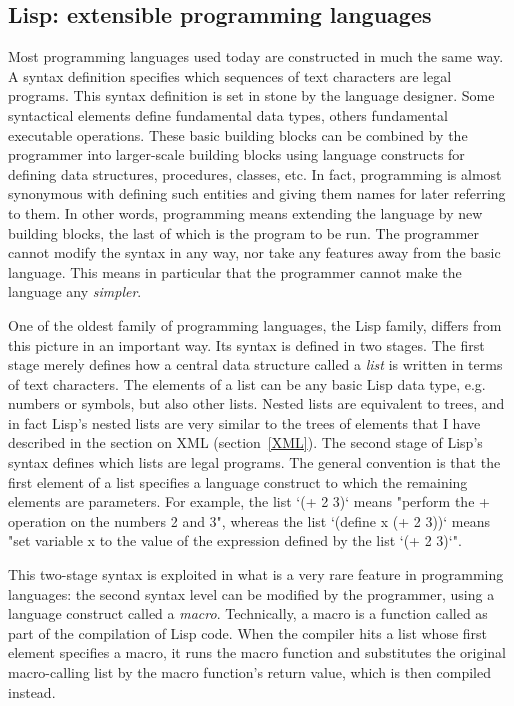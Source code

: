 \subsection{Lisp: extensible programming languages}
\label{lisp}

Most programming languages used today are constructed in much the same way. A syntax definition specifies which sequences of text characters are legal programs. This syntax definition is set in stone by the language designer. Some syntactical elements define fundamental data types, others fundamental executable operations. These basic building blocks can be combined by the programmer into larger-scale building blocks using language constructs for defining data structures, procedures, classes, etc. In fact, programming is almost synonymous with defining such entities and giving them names for later referring to them. In other words, programming means extending the language by new building blocks, the last of which is the program to be run. The programmer cannot modify the syntax in any way, nor take any features away from the basic language. This means in particular that the programmer cannot make the language any \textit{simpler}.

One of the oldest family of programming languages, the Lisp family, differs from this picture in an important way. Its syntax is defined in two stages. The first stage merely defines how a central data structure called a \textit{list} is written in terms of text characters. The elements of a list can be any basic Lisp data type, e.g. numbers or symbols, but also other lists. Nested lists are equivalent to trees, and in fact Lisp's nested lists are very similar to the trees of elements that I have described in the section on XML (section~\ref{XML}). The second stage of Lisp's syntax defines which lists are legal programs. The general convention is that the first element of a list specifies a language construct to which the remaining elements are parameters. For example, the list `(+ 2 3)` means "perform the + operation on the numbers 2 and 3", whereas the list `(define x (+ 2 3))` means "set variable x to the value of the expression defined by the list `(+ 2 3)`".

This two-stage syntax is exploited in what is a very rare feature in programming languages: the second syntax level can be modified by the programmer, using a language construct called a \textit{macro}. Technically, a macro is a function called as part of the compilation of Lisp code. When the compiler hits a list whose first element specifies a macro, it runs the macro function and substitutes the original macro-calling list by the macro function's return value, which is then compiled instead.

